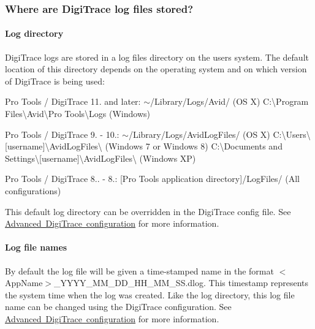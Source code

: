 \hypertarget{a00834_digitrace__logfiles__wherearethelogs}{}\subsubsection{Where are Digi\+Trace log files stored?}\label{a00834_digitrace__logfiles__wherearethelogs}
 \hypertarget{a00834_digitrace__logfiles__wherearethelogs__directory}{}\paragraph{Log directory}\label{a00834_digitrace__logfiles__wherearethelogs__directory}
 Digi\+Trace logs are stored in a log files directory on the user\textquotesingle{}s system. The default location of this directory depends on the operating system and on which version of Digi\+Trace is being used\+:

 
\begin{DoxyItemize}
\item Pro Tools / Digi\+Trace 11. and later\+: $\sim$/\+Library/\+Logs/\+Avid/ (OS X)  C\+:\textbackslash{}Program Files\textbackslash{}Avid\textbackslash{}Pro Tools\textbackslash{}Logs (Windows)   
\item Pro Tools / Digi\+Trace 9. -\/ 10.\+: $\sim$/\+Library/\+Logs/\+Avid\+Log\+Files/ (OS X)  C\+:\textbackslash{}Users\textbackslash{}\mbox{[}username\mbox{]}\textbackslash{}Avid\+Log\+Files\textbackslash{} (Windows 7 or Windows 8)  C\+:\textbackslash{}Documents and Settings\textbackslash{}\mbox{[}username\mbox{]}\textbackslash{}Avid\+Log\+Files\textbackslash{} (Windows XP)   
\item Pro Tools / Digi\+Trace 8.. -\/ 8.\+: \mbox{[}Pro Tools application directory\mbox{]}/\+Log\+Files/ (All configurations)   
\end{DoxyItemize}

 This default log directory can be overridden in the Digi\+Trace config file. See \mbox{\hyperlink{a00834_digitrace__advancedconfiguration}{Advanced Digi\+Trace configuration}} for more information.

\hypertarget{a00834_digitrace__logfiles__wherearethelogs__name}{}\paragraph{Log file names}\label{a00834_digitrace__logfiles__wherearethelogs__name}
 By default the log file will be given a time-\/stamped name in the format {\ttfamily $<$App\+Name$>$\+\_\+\+Y\+Y\+Y\+Y\+\_\+\+M\+M\+\_\+\+D\+D\+\_\+\+H\+H\+\_\+\+M\+M\+\_\+\+S\+S.\+dlog}. This timestamp represents the system time when the log was created. Like the log directory, this log file name can be changed using the Digi\+Trace configuration. See \mbox{\hyperlink{a00834_digitrace__advancedconfiguration}{Advanced Digi\+Trace configuration}} for more information.

